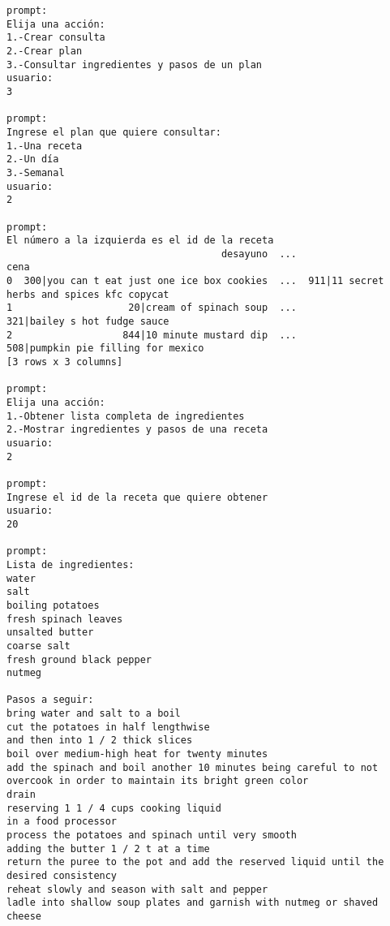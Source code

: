 \documentclass{article}
\begin{document}
\begin{verbatim}
prompt:
Elija una acción:
1.-Crear consulta
2.-Crear plan
3.-Consultar ingredientes y pasos de un plan
usuario:
3

prompt:
Ingrese el plan que quiere consultar:
1.-Una receta
2.-Un día
3.-Semanal
usuario:
2

prompt:
El número a la izquierda es el id de la receta
                                     desayuno  ...                                        cena
0  300|you can t eat just one ice box cookies  ...  911|11 secret herbs and spices kfc copycat
1                    20|cream of spinach soup  ...                321|bailey s hot fudge sauce
2                   844|10 minute mustard dip  ...          508|pumpkin pie filling for mexico
[3 rows x 3 columns]

prompt:
Elija una acción:
1.-Obtener lista completa de ingredientes
2.-Mostrar ingredientes y pasos de una receta
usuario:
2

prompt:
Ingrese el id de la receta que quiere obtener
usuario:
20

prompt:
Lista de ingredientes:
water
salt
boiling potatoes
fresh spinach leaves
unsalted butter
coarse salt
fresh ground black pepper
nutmeg

Pasos a seguir:
bring water and salt to a boil
cut the potatoes in half lengthwise
and then into 1 / 2 thick slices
boil over medium-high heat for twenty minutes
add the spinach and boil another 10 minutes being careful to not overcook in order to maintain its bright green color
drain
reserving 1 1 / 4 cups cooking liquid
in a food processor
process the potatoes and spinach until very smooth
adding the butter 1 / 2 t at a time
return the puree to the pot and add the reserved liquid until the desired consistency
reheat slowly and season with salt and pepper
ladle into shallow soup plates and garnish with nutmeg or shaved cheese
\end{verbatim}
\end{document}
